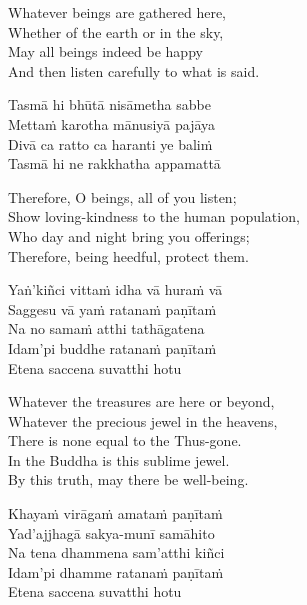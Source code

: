 \begin{english-verses}
  Whatever beings are gathered here,\\
  Whether of the earth or in the sky,\\
  May all beings indeed be happy\\
  And then listen carefully to what is said.
\end{english-verses}

\begin{pali-hang-continued}
  Tasmā hi bhūtā nisāmetha sabbe\\
  Mettaṁ karotha mānusiyā pajāya\\
  Divā ca ratto ca haranti ye baliṁ\\
  Tasmā hi ne rakkhatha appamattā
\end{pali-hang-continued}

\begin{english-verses}
  Therefore, O beings, all of you listen;\\
  Show loving-kindness to the human population,\\
  Who day and night bring you offerings;\\
  Therefore, being heedful, protect them.
\end{english-verses}

\ifninebythirteen\clearpage\fi

\begin{pali-hang-continued}
  Yaṅ'kiñci vittaṁ idha vā huraṁ vā\\
  Saggesu vā yaṁ ratanaṁ paṇītaṁ\\
  Na no samaṁ atthi tathāgatena\\
  Idam'pi buddhe ratanaṁ paṇītaṁ\\
  Etena saccena suvatthi hotu
\end{pali-hang-continued}

\ifbfive\clearpage\fi
\ifafive\clearpage\fi

\begin{english-verses}
  Whatever the treasures are here or beyond,\\
  Whatever the precious jewel in the heavens,\\
  There is none equal to the Thus-gone.\\
  In the Buddha is this sublime jewel.\\
  By this truth, may there be well-being.
\end{english-verses}

\begin{pali-hang-continued}
  Khayaṁ virāgaṁ amataṁ paṇītaṁ\\
  Yad'ajjhagā sakya-munī samāhito\\
  Na tena dhammena sam'atthi kiñci\\
  Idam'pi dhamme ratanaṁ paṇītaṁ\\
  Etena saccena suvatthi hotu
\end{pali-hang-continued}

